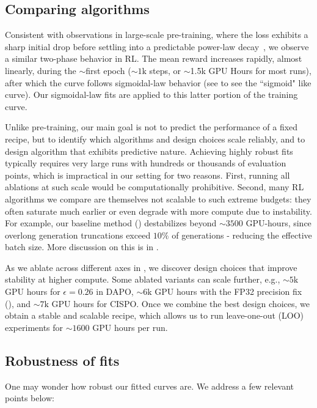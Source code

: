 \subsection{Comparing algorithms} \label{appendix:comparing_algos}
Consistent with observations in large-scale pre-training, where the loss exhibits a sharp initial drop before settling into a predictable power-law decay~\citep{misfitting}, we observe a similar two-phase behavior in RL. The mean reward increases rapidly, almost linearly, during the $\sim$first epoch ($\sim 1\text{k}$ steps, or $\sim$1.5k GPU Hours for most runs), after which the curve follows sigmoidal-law behavior (see  to see the ``sigmoid" like curve). Our sigmoidal-law fits are applied to this latter portion of the training curve. 

Unlike pre-training, our main goal is not to predict the performance of a fixed recipe, but to identify which algorithms and design choices scale reliably, and to design algorithm that exhibits predictive nature. Achieving highly robust fits typically requires very large runs with hundreds or thousands of evaluation points, which is impractical in our setting for two reasons. First, running all ablations at such scale would be computationally prohibitive. Second, many RL algorithms we compare are themselves not scalable to such extreme budgets: they often saturate much earlier or even degrade with more compute due to instability. For example, our baseline method () destabilizes beyond $\sim 3500$ GPU-hours, since overlong generation truncations exceed $10\%$ of generations - reducing the effective batch size. More discussion on this is in . 

As we ablate across different axes in , we discover design choices that improve stability at higher compute. Some ablated variants can scale further, e.g., $\sim 5\text{k}$ GPU hours for $\epsilon=0.26$ in DAPO, $\sim 6\text{k}$ GPU hours with the FP32 precision fix (), and $\sim 7\text{k}$ GPU hours for CISPO. Once we combine the best design choices, we obtain a stable and scalable recipe, which allows us to run leave-one-out (LOO) experiments for $\sim 1600$ GPU hours per run.

\subsection{Robustness of fits} \label{appendix:fits_robustness}
One may wonder how robust our fitted curves are. We address a few relevant points below:

